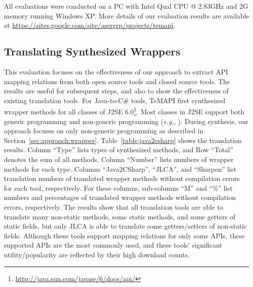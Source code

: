 All evaluations were conducted on a PC with Intel Qual CPU @ 2.83GHz and 2G memory running Windows XP. More details
of our evaluation results are available at \url{https://sites.google.com/site/asergrp/projects/temapi}.


\subsection{Translating Synthesized Wrappers}
\label{sec:evaluation:element}
This evaluation focuses on the effectiveness of our approach to extract API mapping relations from both open source tools and closed source tools. The results are useful for subsequent steps, and also to show the effectiveness of existing translation tools. For Java-to-C\# tools, TeMAPI first synthesized wrapper methods for all classes of J2SE 6.0\footnote{\url{http://java.sun.com/javase/6/docs/api/}}. Most classes in J2SE support both generic programming and non-generic programming (\emph{e.g.}, ). During synthesis, our approach focuses on only non-generic programming as described in Section~\ref{sec:approach:wrapper}. Table~\ref{table:java2csharp} shows the translation results. Column ``Type'' lists types of synthesized methods, and Row ``Total'' denotes the sum of all methods. Column ``Number'' lists numbers of wrapper methods for each type. Columns ``Java2CSharp'', ``JLCA'', and ``Sharpen'' list translation numbers of translated wrapper methods without compilation errors for each tool, respectively. For these columns, sub-columns ``M'' and ``\%'' list numbers and percentages of translated wrapper methods without compilation errors, respectively. The results show that all translation tools are able to translate many non-static methods, some static methods, and some getters of static fields, but only JLCA is able to translate some getters/setters of non-static fields. Although these tools support mapping relations for only some APIs, these supported APIs are the most commonly used, and these tools' significant utility/popularity are reflected by their high download counts.
